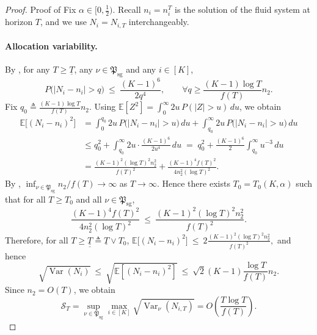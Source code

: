 \documentclass[10pt,a4paper]{amsart}
\newcommand{\E}{{\mathbb{E}}}
\newcommand{\var}{\operatorname{Var}}
\begin{document}
\begin{proof}{Proof of }
Fix $\alpha\in[0,\tfrac12)$. Recall $n_i = n_i^T$ is the solution of the fluid system at horizon $T$, and we use $N_i = N_{i,T}$ interchangeably.
\paragraph{Allocation variability.}
By , for any $T\ge \underline T$, any $\nu \in \mathfrak{P}_{\text{sg}}$ and any $i\in[K]$,
\[
P\big(|N_i-n_i|>q\big)\ \le\ \frac{(K-1)^6}{2q^4},
\qquad \forall q\ge \frac{(K-1)\log T}{f(T)}n_2.
\]
Fix $q_0\triangleq \frac{(K-1)\log T}{f(T)}n_2$. Using
$\E[Z^2]=\int_0^\infty 2u\,P(|Z|>u)\,du$, we obtain
\begin{align*}
\E\big[(N_i-n_i)^2\big]
&= \int_0^{q_0} 2u\,P\big(|N_i-n_i|>u\big)\,du
   +\int_{q_0}^{\infty} 2u\,P\big(|N_i-n_i|>u\big)\,du \\
&\le q_0^2 + \int_{q_0}^{\infty} 2u\cdot \frac{(K-1)^6}{2u^4}\,du
 \;=\; q_0^2 + \frac{(K-1)^6}{2}\int_{q_0}^{\infty} u^{-3}\,du \\
&= \frac{(K-1)^2 (\log T)^2 n_2^2}{f(T)^2}+\frac{(K-1)^4 f(T)^2}{4n_2^2(\log T)^2}.
\end{align*}
By , $\inf_{\nu\in\mathfrak{P}_{\text{sg}}} n_2/f(T)\to\infty$ as $T\to\infty$.
Hence there exists $T_0=T_0(K,\alpha)$ such that for all $T\ge T_0$ and all $\nu\in\mathfrak{P}_{\text{sg}}$,
\[
\frac{(K-1)^4 f(T)^2}{4n_2^2(\log T)^2}\ \le\ \frac{(K-1)^2 (\log T)^2 n_2^2}{f(T)^2}.
\]
Therefore, for all $T\ge \underline{\underline T}\triangleq \underline T\vee T_0$, $\E\big[(N_i-n_i)^2\big]\ \le\ 2\frac{(K-1)^2 (\log T)^2 n_2^2}{f(T)^2},$ and hence 
\[
\sqrt{\var(N_i)}\ \le\ \sqrt{\E[(N_i-n_i)^2]}\ \le\ \sqrt{2}(K-1)\frac{\log T}{f(T)}n_2.
\]
Since $n_2=O(T)$, we obtain 
\[
\mathcal S_T
=\sup_{\nu\in\mathfrak{P}_{\text{sg}}}\max_{i\in[K]}\sqrt{\var_\nu(N_{i,T})}
= O\left(\frac{T\log T}{f(T)}\right).
\]


\end{proof}
\end{document}
